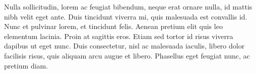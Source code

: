 Nulla sollicitudin, lorem ac feugiat bibendum, neque erat ornare nulla, id
mattis nibh velit eget ante.  Duis tincidunt viverra mi, quis malesuada est
convallis id.  Nunc et pulvinar lorem, et tincidunt felis.  Aenean pretium
elit quis leo elementum lacinia.  Proin at sagittis eros.  Etiam sed tortor
id risus viverra dapibus ut eget nunc.  Duis consectetur, nisl ac malesuada
iaculis, libero dolor facilisis risus, quis aliquam arcu augue et libero. 
Phasellus eget feugiat nunc, ac pretium diam.
